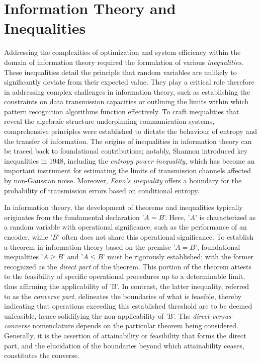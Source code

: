 \documentclass[journal,12pt,onecolumn,draftclsnofoot,]{IEEEtran}
\begin{document}
	\section{Information Theory and Inequalities}
	Addressing the complexities of optimization and system efficiency within the domain of information theory required the formulation of various \emph{inequalities}. These inequalities detail the principle that random variables are unlikely to significantly deviate from their expected value. They play a critical role therefore in addressing complex challenges in information theory, such as establishing the constraints on data transmission capacities or outlining the limits within which pattern recognition algorithms function effectively. To craft inequalities that reveal the algebraic structure underpinning communication systems, comprehensive principles were established to dictate the behaviour of entropy and the transfer of information. The origins of inequalities in information theory can be traced back to foundational contributions; notably, Shannon introduced key inequalities in 1948, including the \emph{entropy power inequality}, which has become an important instrument for estimating the limits of transmission channels affected by non-Gaussian noise. Moreover, \emph{Fano's inequality} offers a boundary for the probability of transmission errors based on conditional entropy.
		
	In information theory, the development of theorems and inequalities typically originates from the fundamental declaration '\(A = B\)'. Here, '\(A\)' is characterized as a random variable with operational significance, such as the performance of an encoder, while '\(B\)' often does not share this operational significance. To establish a theorem in information theory based on the premise '\(A=B\)', foundational inequalities '\(A \geq B\)' and '\(A \leq B\)' must be rigorously established; with the former recognized as the \emph{direct part} of the theorem. This portion of the theorem attests to the feasibility of specific operational procedures up to a determinable limit, thus affirming the applicability of 'B'. In contrast, the latter inequality, referred to as the \emph{converse part}, delineates the boundaries of what is feasible, thereby indicating that operations exceeding this established threshold are to be deemed unfeasible, hence solidifying the non-applicability of 'B'. The \emph{direct-versus-converse} nomenclature depends on the particular theorem being considered. Generally, it is the assertion of attainability or feasibility that forms the direct part, and the elucidation of the boundaries beyond which attainability ceases, constitutes the converse.
	
\end{document}

